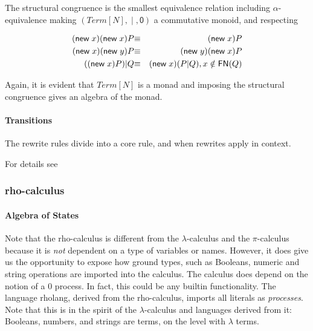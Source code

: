 The structural congruence is the smallest equivalence relation including $\alpha$-equivalence making $(Term[N],\;\mathsf{|}\;,\mathsf{0})$ a commutative monoid, and respecting

\begin{eqnarray*}
  \mathsf{(}\mathsf{new}\; x\mathsf{)}\mathsf{(}\mathsf{new}\; x\mathsf{)}P & \mathsf{\equiv} & \mathsf{(}\mathsf{new}\; x\mathsf{)}P \\
  \mathsf{(}\mathsf{new}\; x\mathsf{)}\mathsf{(}\mathsf{new}\; y\mathsf{)}P & \mathsf{\equiv} & \mathsf{(}\mathsf{new}\; y\mathsf{)}\mathsf{(}\mathsf{new}\; x\mathsf{)}P \\
  (\mathsf{(}\mathsf{new}\; x\mathsf{)}P)\mathsf{|}Q & \mathsf{\equiv} & \mathsf{(}\mathsf{new}\; x\mathsf{)}(P\mathsf{|}Q), x \notin \mathsf{FN}(Q)
\end{eqnarray*}

Again, it is evident that $Term[N]$ is a monad and imposing the structural congruence gives an algebra of the monad.

\paragraph{Transitions}
The rewrite rules divide into a core rule, and when rewrites apply in
context.

For details see \cite{DBLP:journals/mscs/Milner92}

\subsubsection{rho-calculus}

\paragraph{Algebra of States}
Note that the rho-calculus is different from the $\lambda$-calculus and the $\pi$-calculus because it is \emph{not} dependent on a type of variables or names. However, it does give us the opportunity to expose how ground types, such as Booleans, numeric and string operations are imported into the calculus. The calculus does depend on the notion of a $0$ process. In fact, this could be any builtin functionality. The language rholang, derived from the rho-calculus, imports all literals as \emph{processes}. Note that this is in the spirit of the $\lambda$-calculus and languages derived from it: Booleans, numbers, and strings are terms, on the level with $\lambda$ terms.

